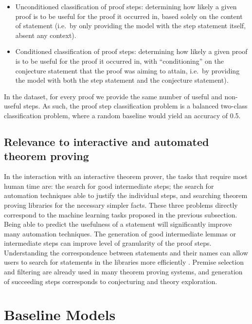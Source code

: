 \documentclass[]{article}
\begin{document}
\begin{itemize}
\item
  Unconditioned classification of proof steps: determining how likely a
  given proof is to be useful for the proof it occurred in, based solely
  on the content of statement (i.e.~by only providing the model with the
  step statement itself, absent any context).
\item
  Conditioned classification of proof steps: determining how likely a
  given proof is to be useful for the proof it occurred in, with
  ``conditioning'' on the conjecture statement that the proof was aiming
  to attain, i.e.~by providing the model with both the step statement
  and the conjecture statement).
\end{itemize}

In the dataset, for every proof we provide the same number of useful and
non-useful steps. As such, the proof step classification problem is a
balanced two-class classification problem, where a random baseline would
yield an accuracy of 0.5.

\subsection{Relevance to interactive and automated theorem proving}

In the interaction with an interactive theorem prover, the
tasks that require most human time are: the search for good
intermediate steps; the search for automation techniques able
to justify the individual steps, and searching theorem
proving libraries for the necessary simpler facts. These three
problems directly correspond to the machine learning tasks
proposed in the previous subsection. Being able to predict
the usefulness of a statement will significantly improve many
automation techniques. The generation of good intermediate lemmas
or intermediate steps can improve level of granularity of the
proof steps. Understanding the correspondence between statements
and their names can allow users to search for statements in the
libraries more efficiently \citep{namespark}. Premise selection
and filtering are already used in many theorem proving systems,
and generation of succeeding steps corresponds to conjecturing
and theory exploration.

\section{Baseline Models}\label{s:models}
\end{document}

